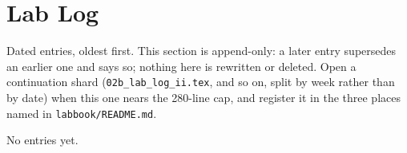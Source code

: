 
\section{Lab Log}
\label{sec:lab-log}

Dated entries, oldest first. This section is append-only: a later entry supersedes an earlier one
and says so; nothing here is rewritten or deleted. Open a continuation shard
(\texttt{02b\_lab\_log\_ii.tex}, and so on, split by week rather than by date) when this one nears
the 280-line cap, and register it in the three places named in \texttt{labbook/README.md}.

No entries yet.
